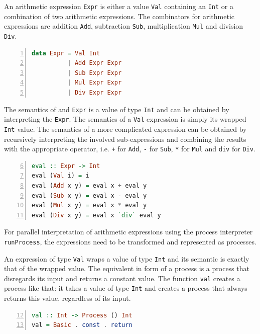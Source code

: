 An arithmetic expression \texttt{Expr} is either a value \texttt{Val} containing an \texttt{Int} or a combination of two arithmetic expressions. The combinators for arithmetic expressions are addition \texttt{Add}, subtraction \texttt{Sub}, multiplication \texttt{Mul} and division \texttt{Div}.
\begin{lstlisting}[language=Haskell, caption=Data model for the representation of arithmetic expressions., label=lst:arith_model, numbers=left, frame=bt]
data Expr = Val Int
          | Add Expr Expr
          | Sub Expr Expr
          | Mul Expr Expr
          | Div Expr Expr
\end{lstlisting}

The semantics of and \texttt{Expr} is a value of type \texttt{Int} and can be obtained by interpreting the \texttt{Expr}. The semantics of a \texttt{Val} expression is simply its wrapped \texttt{Int} value. The semantics of a more complicated expression can be obtained by recursively interpreting the involved sub-expressions and combining the results with the appropriate operator, i.e. \texttt{+} for \texttt{Add}, \texttt{-} for \texttt{Sub}, \texttt{*} for \texttt{Mul} and \texttt{div} for \texttt{Div}.
\begin{lstlisting}[language=Haskell, caption=Implementation of an interpreter for arithmetic expressions., label=lst:arith_eval, numbers=left, frame=bt, firstnumber=6]
eval :: Expr -> Int
eval (Val i) = i
eval (Add x y) = eval x + eval y
eval (Sub x y) = eval x - eval y
eval (Mul x y) = eval x * eval y
eval (Div x y) = eval x `div` eval y
\end{lstlisting}

For parallel interpretation of arithmetic expressions using the process interpreter \texttt{runProcess}, the expressions need to be transformed and represented as processes.

An expression of type \texttt{Val} wraps a value of type \texttt{Int} and its semantic is exactly that of the wrapped value. The equivalent in form of a process is a process that disregards its input and returns a constant value. The function \texttt{val} creates a process like that: it takes a value of type \texttt{Int} and creates a process that always returns this value, regardless of its input.
\begin{lstlisting}[language=Haskell, caption=A function that generates basic processes for the representation of \texttt{Val} expressions., label=lst:arith_val, numbers=left, frame=bt, firstnumber=12]
val :: Int -> Process () Int
val = Basic . const . return
\end{lstlisting}

